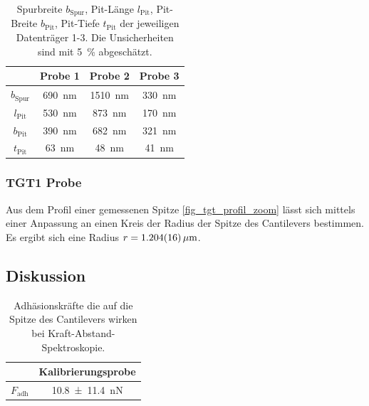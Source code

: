 \documentclass[
	a4paper,
	12pt,
	pagesize,
	ngerman
]{scrartcl}
\begin{document}
\begin{table}[H]
		\centering
		\begin{tabular}{ c | c | c | c }
			 & Probe 1 & Probe 2 & Probe 3\\ \hline
			$b_\text{Spur}$ & \SI{690}{nm} & \SI{1510}{nm} &\SI{330}{nm} \\
			$l_\text{Pit}$ & \SI{530}{nm} & \SI{873}{nm} &\SI{170}{nm} \\
			$b_\text{Pit}$ & \SI{390}{nm} & \SI{682}{nm} &\SI{321}{nm} \\
			$t_\text{Pit}$ & \SI{63}{nm} & \SI{48}{nm} &\SI{41}{nm} \\
		\end{tabular}
		\caption{Spurbreite $b_\text{Spur}$, Pit-Länge $l_\text{Pit}$, Pit-Breite $b_\text{Pit}$, Pit-Tiefe $t_\text{Pit}$ der jeweiligen Datenträger 1-3.
		Die Unsicherheiten sind mit \SI{5}{\%} abgeschätzt.}
		\label{tb_spur}
	\end{table}

	\subsubsection{TGT1 Probe} %
	Aus dem Profil einer gemessenen Spitze \cref{fig_tgt_profil_zoom} lässt sich mittels einer Anpassung an einen Kreis der Radius der Spitze des Cantilevers bestimmen.
	Es ergibt sich eine Radius $r=\SI{1.204 +-0.016}{\mu m}$.

		\subsection{Diskussion}

\begin{table}[H]
		\centering
		\begin{tabular}{ c | c }
			 & Kalibrierungsprobe\\ \hline
			$F_\text{adh}$ & \SI{10.8+-11.4}{nN} \\
		\end{tabular}
		\caption{Adhäsionskräfte die auf die Spitze des Cantilevers wirken bei Kraft-Abstand-Spektroskopie.} %
		\label{tb_ds}
	\end{table}
\end{document}
